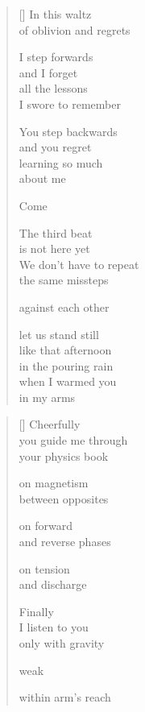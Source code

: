 \documentclass[12pt,a4paper]{article}
\begin{document}

\newpage

\poemtitle{}

\settowidth{\versewidth}{like that afternoon}

\bigskip

\begin{verse}[\versewidth]
  In this waltz \\
  of oblivion and regrets

  I step forwards \\
  and I forget \\
  all the lessons \\
  I swore to remember

  You step backwards \\
  and you regret \\
  learning so much \\
  about me

  Come

  The third beat \\
  is not here yet \\
  We don't have to repeat \\
  the same missteps

  against each other

  let us stand still \\
  like that afternoon \\
  in the pouring rain \\
  when I warmed you \\
  in my arms
\end{verse}


\newpage

\poemtitle{}

\settowidth{\versewidth}{Cheerfully you talk to me}

\bigskip

\begin{verse}[\versewidth]
  Cheerfully \\
  you guide me through \\
  your physics book

  on magnetism \\
  between opposites

  on forward \\
  and reverse phases

  on tension \\
  and discharge

  Finally \\
  I listen to you \\
  only with gravity

  weak

  within arm's reach
\end{verse}
\end{document}
